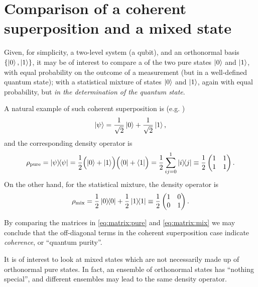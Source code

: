 \section{Comparison of a coherent superposition and a mixed state}
\label{sec:mix}

Given, for simplicity, a two-level system (a qubit), and an orthonormal basis
$\left\{\ket{0}, \ket{1}\right\}$, it may be of interest to compare a 
of the two pure states $\ket{0}$ and $\ket{1}$, with equal probability on the outcome of
a measurement (but in a well-defined quantum state); with a statistical mixture of
states $\ket{0}$ and $\ket{1}$, again with equal probability, but
\emph{in the determination of the quantum state}.

A natural example of such coherent superposition is (e.g. \cite[Example 2.4]{Nakahara})
\[
  \ket{\psi} = \frac{1}{\sqrt{2}}\ket{0} + \frac{1}{\sqrt{2}}\ket{1}\text{,}
\]
and the corresponding density operator is
\begin{multline}\label{eq:matrix:pure}
  \rho_{\mathrm{pure}} = \ketbra{\psi}{\psi} =
  \frac{1}{2}\qty\Big(\ket{0} + \ket{1}) \qty\Big(\bra{0} + \bra{1}) =
  \frac{1}{2}\sum_{ij=0}^1\ketbra{i}{j} \underset{}{\equiv}
  \frac{1}{2}
    \begin{pmatrix}
      1 &1  \\
      1 &1  \\
    \end{pmatrix}
  \text{.}
\end{multline}
On the other hand, for the statistical mixture, the density operator is
\begin{equation}\label{eq:matrix:mix}
  \rho_{\mathrm{mix}} = \frac{1}{2}\ketbra{0}{0} + \frac{1}{2}\ketbra{1}{1} \underset{}{\equiv}
  \frac{1}{2}
    \begin{pmatrix}
      1 &0  \\
      0 &1  \\
    \end{pmatrix}
  \text{.}
\end{equation}

By comparing the matrices in \eqref{eq:matrix:pure} and \eqref{eq:matrix:mix}
we may conclude that the off-diagonal terms in the coherent superposition case
indicate \emph{coherence}, or ``quantum purity''.

It is of interest to look at mixed states
which are not necessarily made up of orthonormal pure states.
In fact, an ensemble of orthonormal states has ``nothing special'',
and different ensembles may lead to the same density operator.

